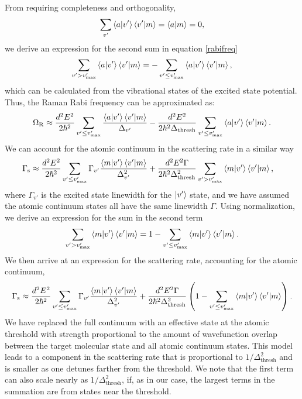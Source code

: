 \documentclass[aps,prx,secnumarabic,amsmath,amssymb,10pt,superscriptaddress]{revtex4-2}
\begin{document}
From requiring completeness and orthogonality,
\begin{equation}
  \displaystyle\sum_{v'} \braket{a|v'}\braket{v'|m} = \braket{a|m} = 0,
\end{equation}
we derive an expression for the second sum in equation \ref{rabifreq}
\begin{equation}
  \displaystyle\sum_{v'> v'_{\text{max}}} \braket{a|v'}\braket{v'|m} = -\displaystyle\sum_{v' \leq v'_{\text{max}}} \braket{a|v'}\braket{v'|m},
\end{equation}
which can be calculated from the vibrational states of the excited state potential. Thus, the Raman Rabi frequency can be approximated as:
\begin{equation}
  \Omega_{\rm R} \approx \frac{d^2E^2}{2\hbar^2}\displaystyle\sum_{v' \leq v'_{\text{max}}} \frac{\braket{a|v'}\braket{v'|m}}{\Delta_{v'}} -  \frac{d^2E^2}{2\hbar^2\Delta_{\text{thresh}}}\displaystyle\sum_{v' \leq v'_{\text{max}}} \braket{a|v'}\braket{v'|m}.
\end{equation}
We can account for the atomic continuum in the scattering rate in a similar way
\begin{align}
  \Gamma_{\rm s} &\approx \frac{d^2E^2}{2\hbar^2}\displaystyle\sum_{v' \leq v'_{\text{max}}}\Gamma_{v'} \frac{\braket{m|v'}\braket{v'|m}}{\Delta_{v'}^2} + \frac{d^2E^2\Gamma}{2\hbar^2\Delta_{\text{thresh}}^2}\displaystyle\sum_{v' > v'_{\text{max}}}\braket{m|v'}\braket{v'|m},
\end{align}
where $\Gamma_{v'}$ is the excited state linewidth for the $\ket{v'}$ state, and we have assumed the atomic continuum states all have the same linewidth $\Gamma$. Using normalization, we derive an expression for the sum in the second term
\begin{equation}
  \displaystyle\sum_{v' > v'_{\text{max}}}\braket{m|v'}\braket{v'|m} = 1 - \displaystyle\sum_{v' \leq v'_{\text{max}}}\braket{m|v'}\braket{v'|m}.
\end{equation}
We then arrive at an expression for the scattering rate, accounting for the atomic continuum,
\begin{equation}
  \Gamma_{\rm s} \approx \frac{d^2E^2}{2\hbar^2}\displaystyle\sum_{v' \leq v'_{\text{max}}}\Gamma_{v'} \frac{\braket{m|v'}\braket{v'|m}}{\Delta_{v'}^2} +  \frac{d^2E^2\Gamma}{2\hbar^2\Delta_{\text{thresh}}^2}\left(1 - \displaystyle\sum_{v' \leq v'_{\text{max}}}\braket{m|v'}\braket{v'|m}\right).
\end{equation}
We have replaced the full continuum with an effective state at the atomic threshold with strength proportional to the amount of wavefunction overlap between the target molecular state and all atomic continuum states. This model leads to a component in the scattering rate that is proportional to $ 1/\Delta_{\text{thresh}}^2$ and is smaller as one detunes farther from the threshold. We note that the first term can also scale nearly as $1/\Delta_{\text{thresh}}^2 $, if, as in our case, the largest terms in the summation are from states near the threshold.
\end{document}
